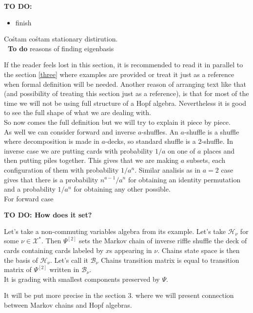 \documentclass[a4paper]{article}
\newcommand{\todo}[1]{\hfill \break \textbf{\Huge TO DO: #1 \hfill \break}\normalsize}
\newcommand{\smalltodo}[1]{\textbf{\ To do}}
\begin{document}
\todo{}
\begin{itemize}
\item finish
\end{itemize}

Cośtam cośtam stationary distirution. \\
\smalltodo \\
reasons of finding eigenbasis

If the reader feels lost in this section, it is recommended to read it in parallel to the section \ref{three}
where examples are provided or treat it just as a reference when formal definition will be needed.
Another reason of arranging text like that (and possibility of treating this section just as a reference),
is that for most of the time we will not be using full structure of a Hopf algebra. Nevertheless it is good
to see the full shape of what we are dealing with. \\
So now comes the full definition but we will try to explain it piece by piece. \\[8pt]

As well we can consider forward and inverse $a$-shuffles. An $a$-shuffle is a shuffle where decomposition
is made in $a$-decks, so standard shuffle is a $2$-shuffle. In inverse case we are putting cards with
probability $1/a$ on one of $a$ places and then putting piles together. This gives that we are making
$a$ subsets, each configuration of them with probability $1/a^n$. Similar analisis as in $a = 2$ case
gives that there is a probability $n^{a-1}/a^n$ for obtaining an identity permutation and a
probability $1/a^n$ for obtaining any other possible. \\
For forward case

\todo{How does it set?}

Let's take a non-commuting variables algebra from its example. Let's take $\mathcal{H}_\nu$ for some
$\nu \in \mathcal{X}^*$. Then $\Psi^{[2]}$ sets the Markov chain of inverse riffle shuffle the deck of cards
containing cards labeled by $x$s appearing in $\nu$. Chains state space is then the basis of
$\mathcal{H}_\nu$. Let's call it $\mathcal{B}_\nu$
Chains transition matrix is equal to transition matrix of $\Psi^{[2]}$ written in $\mathcal{B}_\nu$.  \\

It is grading with smallest components preserved by $\Psi$.

It will be put more
precise in the section 3. where we will present connection between Markov chains and Hopf algebras.
\end{document}
